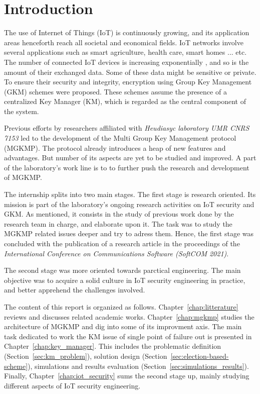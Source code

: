 \newcommand{\package}{\emph}

\chapter*{Introduction}

The use of Internet of Things (IoT) is continuously growing, and its application areas henceforth reach all societal and economical fields. IoT networks involve several applications such as smart agriculture, health care, smart homes ... etc. The number of connected IoT devices is increasing exponentially \cite{helpnet}, and so is the amount of their exchanged data. Some of these data might be sensitive or private. To ensure their security and integrity, encryption using Group Key Management (GKM) schemes were proposed. These schemes assume the presence of a centralized Key Manager (KM), which is regarded as the central component of the system.

Previous efforts by researchers affiliated with \emph{Heudiasyc laboratory UMR CNRS 7153} led to the development of the Multi Group Key Management protocol (MGKMP). The protocol already introduces a heap of new features and advantages. But number of its aspects are yet to be studied and improved. A part of the laboratory's work line is to to further push the research and development of MGKMP.

The internship splits into two main stages. The first stage is research oriented. Its mission is part of the laboratory's ongoing research activities on IoT security and GKM. As mentioned, it consists in the study of previous work done by the research team in charge, and elaborate upon it. The task was to study the MGKMP related issues deeper and try to adress them. Hence, the first stage was concluded with the publication of a research article in the proceedings of the \emph{International Conference on Communications Software (SoftCOM 2021)}.

The second stage was more oriented towards parctical engineering. The main objective was to acquire a solid culture in IoT security engineering in practice, and better apprehend the challenges involved.

The content of this report is organized as follows. Chapter~\ref{chap:litterature} reviews and discusses related academic works. Chapter~\ref{chap:mgkmp} studies the architecture of MGKMP and dig into some of its improvment axis. The main task dedicated to work the KM issue of single point of failure out is presented in Chapter~\ref{chap:key_manager}. This includes the problematic definition (Section~\ref{sec:km_problem}), solution design (Section~\ref{sec:election-based-scheme}), simulations and results evaluation (Section~\ref{sec:simulations_results}). Finally, Chapter~\ref{chap:iot_security} sums the second stage up, mainly studying different aspects of IoT security engineering.